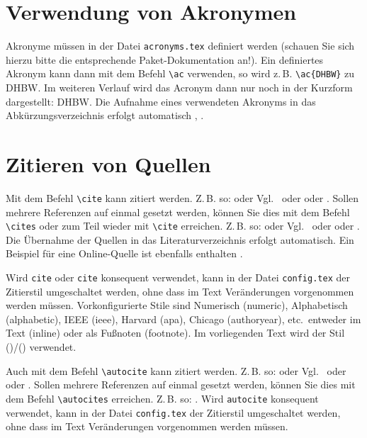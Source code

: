 \section{Verwendung von Akronymen}
Akronyme müssen in der Datei \texttt{acronyms.tex} definiert werden (schauen Sie sich hierzu bitte die entsprechende 
Paket-Dokumentation an!). Ein definiertes Akronym kann dann mit dem Befehl \texttt{\textbackslash ac} verwenden, so wird 
z.\,B. \texttt{\textbackslash ac\{DHBW\}} zu \ac{DHBW}. Im weiteren Verlauf wird das Acronym dann nur noch in der Kurzform 
dargestellt: \ac{DHBW}. Die Aufnahme eines verwendeten Akronyms in das Abkürzungsverzeichnis erfolgt automatisch 
\autocite[Vgl.][S. 77ff]{TestOnlineQuelle}, \autocite[Vgl.][S. 42]{ME12}. 

\section{Zitieren von Quellen}
Mit dem Befehl \texttt{\textbackslash cite} kann zitiert werden. Z.\,B. so: \cite[Vgl.][S.~18ff]{ME12} oder Vgl.~\cite[S.~18ff]{ME12} 
oder \cite[S.~18ff]{ME12} oder \cite{ME12}. Sollen mehrere Referenzen auf einmal gesetzt werden, können Sie dies mit dem 
Befehl \texttt{\textbackslash cites} oder zum Teil wieder mit 
\texttt{\textbackslash cite} erreichen. Z.\,B. so: \cites[Vgl.][S. 10]{ME12}[Vgl.][S. 100]{TD15}  
oder Vgl.~\cite{ME12, TD15} oder oder \cite{ME12, TD15}. Die Übernahme der Quellen in das Literaturverzeichnis erfolgt automatisch. 
Ein Beispiel für eine Online-Quelle ist ebenfalls enthalten \cite{TestOnlineQuelle}.

Wird \texttt{cite} oder \texttt{cite} konsequent verwendet, kann in der Datei \texttt{config.tex} der Zitierstil umgeschaltet 
werden, ohne dass im Text Veränderungen vorgenommen werden müssen. Vorkonfigurierte Stile sind Numerisch (numeric), 
Alphabetisch (alphabetic), IEEE (ieee), Harvard (apa), Chicago (authoryear), etc.~entweder im Text (inline) oder als Fußnoten 
(footnote). Im vorliegenden Text wird der Stil (\indextype)/(\position) verwendet.

Auch mit dem Befehl \texttt{\textbackslash autocite} kann zitiert werden. Z.\,B. so: \autocite[Vgl.][S.~18ff]{ME12}
oder Vgl.~\autocite[S.~18ff]{ME12} oder \autocite[S.~18ff]{ME12} oder \autocite{ME12}{.} Sollen mehrere Referenzen auf einmal 
gesetzt werden, können Sie dies mit dem Befehl \texttt{\textbackslash autocites} erreichen. Z.\,B. so:
\autocites[Vgl.][S. 10]{ME12}[][S. 100]{TD15}. Wird \texttt{autocite} konsequent verwendet, kann in der Datei 
\texttt{config.tex} der Zitierstil umgeschaltet werden, ohne dass im Text Veränderungen vorgenommen werden müssen. 

